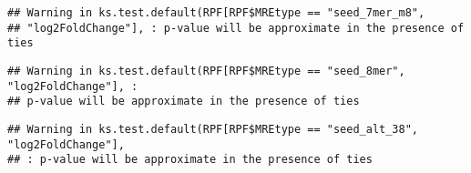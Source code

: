 \documentclass[
]{article}
\newenvironment{Shaded}{\begin{snugshade}}{\end{snugshade}}
\newcommand{\FunctionTok}[1]{\textcolor[rgb]{0.13,0.29,0.53}{\textbf{#1}}}
\newcommand{\NormalTok}[1]{#1}
\newcommand{\OtherTok}[1]{\textcolor[rgb]{0.56,0.35,0.01}{#1}}
\newcommand{\SpecialCharTok}[1]{\textcolor[rgb]{0.81,0.36,0.00}{\textbf{#1}}}
\newcommand{\StringTok}[1]{\textcolor[rgb]{0.31,0.60,0.02}{#1}}
\begin{document}
\begin{Shaded}
\end{Shaded}

\begin{verbatim}
## Warning in ks.test.default(RPF[RPF$MREtype == "seed_7mer_m8",
## "log2FoldChange"], : p-value will be approximate in the presence of ties
\end{verbatim}

\begin{Shaded}
\end{Shaded}

\begin{verbatim}
## Warning in ks.test.default(RPF[RPF$MREtype == "seed_8mer", "log2FoldChange"], :
## p-value will be approximate in the presence of ties
\end{verbatim}

\begin{Shaded}
\end{Shaded}

\begin{verbatim}
## Warning in ks.test.default(RPF[RPF$MREtype == "seed_alt_38", "log2FoldChange"],
## : p-value will be approximate in the presence of ties
\end{verbatim}
\end{document}
